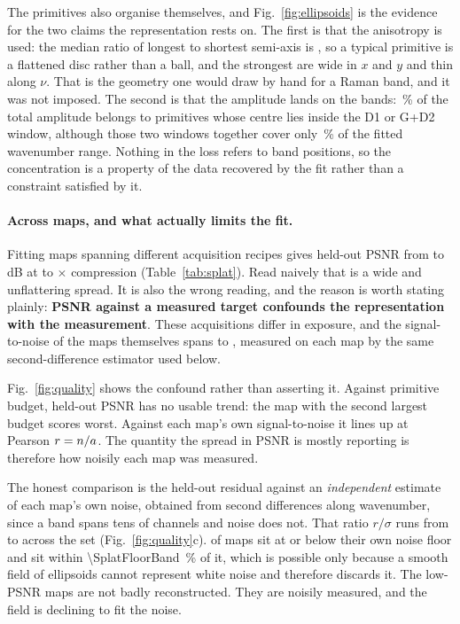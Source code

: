 The primitives also organise themselves, and Fig.~\ref{fig:ellipsoids} is the
evidence for the two claims the representation rests on. The first is that the
anisotropy is used: the median ratio of longest to shortest semi-axis is
\SplatAniso, so a typical primitive is a flattened disc rather than a ball, and
the strongest are wide in $x$ and $y$ and thin along $\nu$. That is the
geometry one would draw by hand for a Raman band, and it was not imposed. The
second is that the amplitude lands on the bands: \SplatAmpBands\,\% of the total
amplitude belongs to primitives whose centre lies inside the D1 or G+D2 window,
although those two windows together cover only \SplatBandSpan\,\% of the fitted
wavenumber range. Nothing in the loss refers to band positions, so the
concentration is a property of the data recovered by the fit rather than a
constraint satisfied by it.

\paragraph{Across maps, and what actually limits the fit.}
Fitting \SplatNfits{} maps spanning different acquisition recipes gives
held-out PSNR from \SplatPSNRevalMin{} to \SplatPSNRevalMax\,dB at
\SplatComprMin{} to \SplatComprMax$\times$ compression
(Table~\ref{tab:splat}). Read naively that is a wide and unflattering spread.
It is also the wrong reading, and the reason is worth stating plainly:
\textbf{PSNR against a measured target confounds the representation with the
measurement}. These acquisitions differ in exposure, and the signal-to-noise
of the maps themselves spans \SplatSNRmin{} to \SplatSNRmax, measured on each
map by the same second-difference estimator used below.

Fig.~\ref{fig:quality} shows the confound rather than asserting it. Against
primitive budget, held-out PSNR has no usable trend: the map with the second
largest budget scores worst. Against each map's own signal-to-noise it lines up
at Pearson $r=n/a$. The quantity the spread in PSNR is mostly
reporting is therefore how noisily each map was measured.

The honest comparison is the held-out residual against an \emph{independent}
estimate of each map's own noise, obtained from second differences along
wavenumber, since a band spans tens of channels and noise does not. That ratio
$r/\sigma$ runs from \SplatResidNoiseMin{} to \SplatResidNoiseMax{} across the
set (Fig.~\ref{fig:quality}c). \SplatNatFloor{} of \SplatNfits{} maps sit at or
below their own noise floor and \SplatNnearFloor{} sit within
\SI{\SplatFloorBand}{\percent} of it, which is possible only because a smooth
field of ellipsoids cannot represent white noise and therefore discards it. The low-PSNR maps are not badly reconstructed. They are noisily
measured, and the field is declining to fit the noise.

